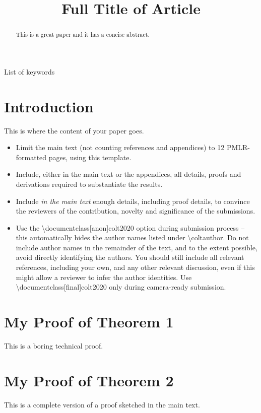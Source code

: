 \documentclass[anon]{colt2020} %
\title[Short Title]{Full Title of Article}
\begin{document}
\maketitle

\begin{abstract}%
  This is a great paper and it has a concise abstract.%
\end{abstract}

\begin{keywords}%
  List of keywords%
\end{keywords}

\section{Introduction}

This is where the content of your paper goes.
\begin{itemize}
  \item Limit the main text (not counting references and appendices) to 12 PMLR-formatted pages, using this template.
  \item Include, either in the main text or the appendices, all details, proofs and derivations required to substantiate the results.
  \item Include {\em in the main text} enough details, including proof details, to convince the reviewers of the contribution, novelty and significance of the submissions.
  \item Use the \textbackslash documentclass[anon]{colt2020} option during submission process -- 
this automatically hides the author names listed under \textbackslash coltauthor. 
Do not include author names in the remainder of the text, and to the extent possible, avoid directly identifying the authors. 
You should still include all relevant references, including your own, and any other relevant discussion, 
even if this might allow a reviewer to infer the author identities. 
Use \textbackslash documentclass[final]{colt2020} only during camera-ready submission.
\end{itemize}




\appendix

\section{My Proof of Theorem 1}

This is a boring technical proof.

\section{My Proof of Theorem 2}

This is a complete version of a proof sketched in the main text.
\end{document}
